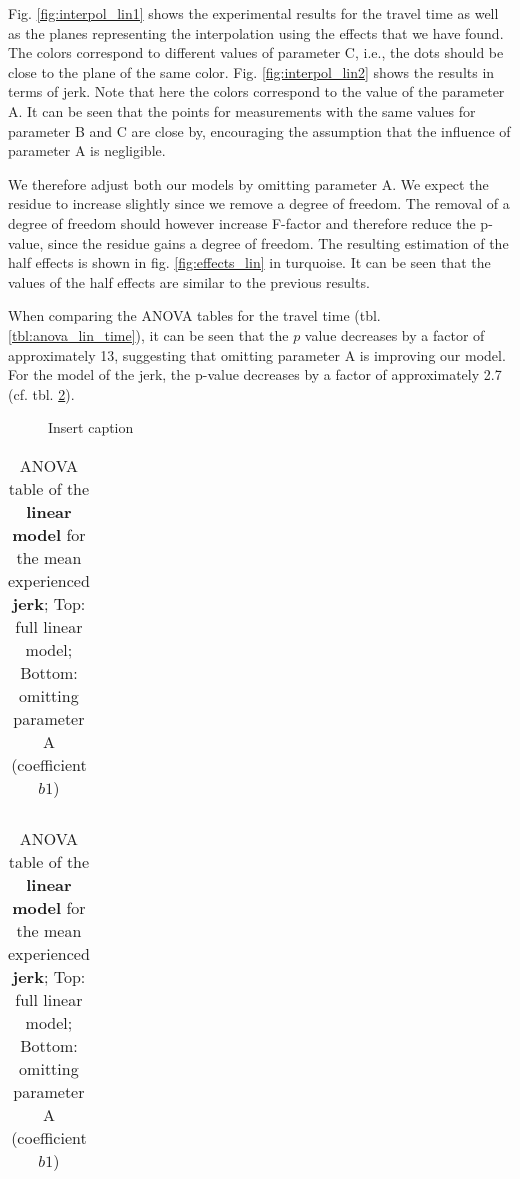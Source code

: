 Fig. \ref{fig:interpol_lin1} shows the experimental results for the travel time as well as the planes representing the interpolation using the effects that we have found. The colors correspond to different values of parameter C, i.e., the dots should be close to the plane of the same color. Fig. \ref{fig:interpol_lin2} shows the results in terms of jerk. Note that here the colors correspond to the value of the parameter A. It can be seen that the points for measurements with the same values for parameter B and C are close by, encouraging the assumption that the influence of parameter A is negligible.

We therefore adjust both our models by omitting parameter A. We expect the residue to increase slightly since we remove a degree of freedom. The removal of a degree of freedom should however increase F-factor and therefore reduce the p-value, since the residue gains a degree of freedom. The resulting estimation of the half effects is shown in fig. \ref{fig:effects_lin} in turquoise. It can be seen that the values of the half effects are similar to the previous results.

 When comparing the ANOVA tables for the travel time (tbl. \ref{tbl:anova_lin_time}), it can be seen that the $p$ value decreases by a factor of approximately 13, suggesting that omitting parameter A is improving our model. For the model of the jerk, the p-value   decreases by a factor of approximately 2.7 (cf. tbl. \ref{tbl:anova_lin_jerk}).
\begin{figure}
    \centering
    \setlength{\abovecaptionskip}{1pt plus 3pt minus 0pt}
	
    \caption{Insert caption}
\end{figure}


\begin{table}[h!]
	\centering

	\begin{tabular}{l r r r r r}
	
	\end{tabular}

	\bigskip

	\begin{tabular}{l r r r r r}
		
	\end{tabular}

	\caption{ANOVA table of the \textbf{linear model} for the mean experienced \textbf{jerk}; Top: full linear model; Bottom: omitting parameter A (coefficient $b1$)}\label{tbl:anova_lin_jerk}
\end{table}


